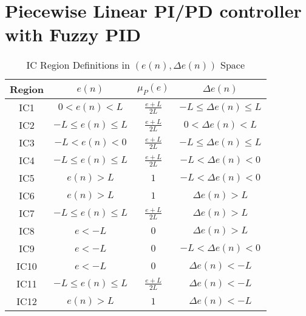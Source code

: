 \section{Piecewise Linear PI/PD controller with Fuzzy PID}
\begin{table}[h!]
\centering
\caption{IC Region Definitions in $(e(n), \Delta e(n))$ Space}
\begin{tabular}{c|cc|c}
\toprule
Region & $e(n)$ & $\mu_P(e)$ &$\Delta e(n)$ \\
\midrule
IC1 & $0<e(n)<L$ & $\frac{e+L}{2L}$ & $-L\leq\Delta e(n)\leq L$\\
IC2 & $-L\leq e(n)\leq L$ & $\frac{e+L}{2L}$ & $0<\Delta e(n)<L$\\
IC3 & $-L<e(n)<0$ & $\frac{e+L}{2L}$ & $-L\leq\Delta e(n)\leq L$\\
IC4 & $-L\leq e(n)\leq L$ & $\frac{e+L}{2L}$ & $-L<\Delta e(n)<0$\\
IC5 & $e(n)>L$ & $1$ & $-L<\Delta e(n)<0$\\
IC6 & $e(n)>L$ & $1$ & $\Delta e(n)>L$\\
IC7 & $-L\leq e(n)\leq L$ & $\frac{e+L}{2L}$ & $\Delta e(n)>L$\\
IC8 & $e<-L$ & $0$ & $\Delta e(n)>L$\\
IC9 & $e<-L$ & $0$  & $-L<\Delta e(n)<0$\\
IC10 & $e<-L$ & $0$  & $\Delta e(n)<-L$\\
IC11 & $-L\leq e(n)\leq L$ & $\frac{e+L}{2L}$  & $\Delta e(n)<-L$\\
IC12 & $e(n)>L$ & $1$ & $\Delta e(n)<-L$\\
\bottomrule
\end{tabular}
\end{table}

